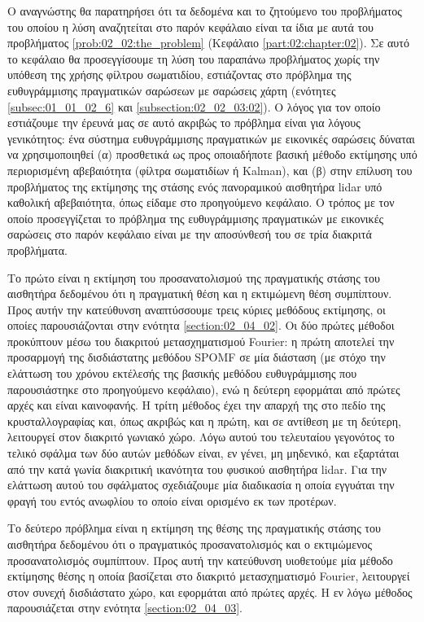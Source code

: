 Ο αναγνώστης θα παρατηρήσει ότι τα δεδομένα και το ζητούμενο του προβλήματος
του οποίου η λύση αναζητείται στο παρόν κεφάλαιο είναι τα ίδια με αυτά του
προβλήματος \ref{prob:02_02:the_problem} (Κεφάλαιο \ref{part:02:chapter:02}).
Σε αυτό το κεφάλαιο θα προσεγγίσουμε τη λύση του παραπάνω προβλήματος χωρίς την
υπόθεση της χρήσης φίλτρου σωματιδίου, εστιάζοντας στο πρόβλημα της
ευθυγράμμισης πραγματικών σαρώσεων με σαρώσεις χάρτη (ενότητες
\ref{subsec:01_01_02_6} και \ref{subsection:02_02_03:02}). Ο λόγος για τον
οποίο εστιάζουμε την έρευνά μας σε αυτό ακριβώς το πρόβλημα είναι για λόγους
γενικότητος: ένα σύστημα ευθυγράμμισης πραγματικών με εικονικές σαρώσεις
δύναται να χρησιμοποιηθεί (α) προσθετικά ως προς οποιαδήποτε βασική μέθοδο
εκτίμησης υπό περιορισμένη αβεβαιότητα (φίλτρα σωματιδίων ή Kalman), και (β)
στην επίλυση του προβλήματος της εκτίμησης της στάσης ενός πανοραμικού
αισθητήρα lidar υπό καθολική αβεβαιότητα, όπως είδαμε στο προηγούμενο κεφάλαιο.
Ο τρόπος με τον οποίο προσεγγίζεται το πρόβλημα της ευθυγράμμισης πραγματικών
με εικονικές σαρώσεις στο παρόν κεφάλαιο είναι με την αποσύνθεσή του σε τρία
διακριτά προβλήματα.

Το πρώτο είναι η εκτίμηση του προσανατολισμού της πραγματικής στάσης του
αισθητήρα δεδομένου ότι η πραγματική θέση και η εκτιμώμενη θέση συμπίπτουν.
Προς αυτήν την κατεύθυνση αναπτύσσουμε τρεις κύριες μεθόδους εκτίμησης, οι
οποίες παρουσιάζονται στην ενότητα \ref{section:02_04_02}. Οι δύο πρώτες
μέθοδοι προκύπτουν μέσω του διακριτού μετασχηματισμού Fourier: η πρώτη αποτελεί
την προσαρμογή της δισδιάστατης μεθόδου SPOMF σε μία διάσταση (με στόχο την
ελάττωση του χρόνου εκτέλεσής της βασικής μεθόδου ευθυγράμμισης που
παρουσιάστηκε στο προηγούμενο κεφάλαιο), ενώ η δεύτερη εφορμάται από πρώτες
αρχές και είναι καινοφανής. Η τρίτη μέθοδος έχει την απαρχή της στο πεδίο της
κρυσταλλογραφίας και, όπως ακριβώς και η πρώτη, και σε αντίθεση με τη δεύτερη,
λειτουργεί στον διακριτό γωνιακό χώρο. Λόγω αυτού του τελευταίου γεγονότος το
τελικό σφάλμα των δύο αυτών μεθόδων είναι, εν γένει, μη μηδενικό, και εξαρτάται
από την κατά γωνία διακριτική ικανότητα του φυσικού αισθητήρα lidar. Για την
ελάττωση αυτού του σφάλματος σχεδιάζουμε μία διαδικασία η οποία εγγυάται την
φραγή του εντός ανωφλίου το οποίο είναι ορισμένο εκ των προτέρων.

Το δεύτερο πρόβλημα είναι η εκτίμηση της θέσης της πραγματικής στάσης του
αισθητήρα δεδομένου ότι ο πραγματικός προσανατολισμός και ο εκτιμώμενος
προσανατολισμός συμπίπτουν. Προς αυτή την κατεύθυνση υιοθετούμε μία μέθοδο
εκτίμησης θέσης η οποία βασίζεται στο διακριτό μετασχηματισμό Fourier,
λειτουργεί στον συνεχή δισδιάστατο χώρο, και εφορμάται από πρώτες αρχές. Η εν
λόγω μέθοδος παρουσιάζεται στην ενότητα \ref{section:02_04_03}.

